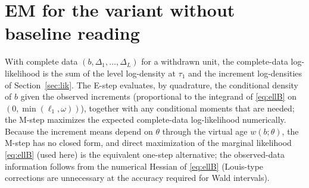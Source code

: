 \documentclass[11pt]{article}
\begin{document}
\section{EM for the variant without baseline reading}\label{app:em}
With complete data $(b,\Delta_1,\dots,\Delta_L)$ for a withdrawn unit, the complete-data
log-likelihood is the sum of the level log-density at $\tau_1$ and the increment log-densities
of Section~\ref{sec:lik}. The E-step evaluates, by quadrature, the conditional density of $b$
given the observed increments (proportional to the integrand of \eqref{eq:ellB} on
$(0,\min(\ell_1,\omega))$), together with any conditional moments that are needed; the
M-step
maximizes the expected complete-data log-likelihood numerically. Because the increment means
depend on $\theta$ through the virtual age $w(b;\theta)$, the M-step has no closed form, and
direct maximization of the marginal likelihood \eqref{eq:ellB} (used here) is the equivalent
one-step alternative; the observed-data information follows from the numerical Hessian of
\eqref{eq:ellB} (Louis-type corrections are unnecessary at the accuracy required for Wald
intervals).
\end{document}
